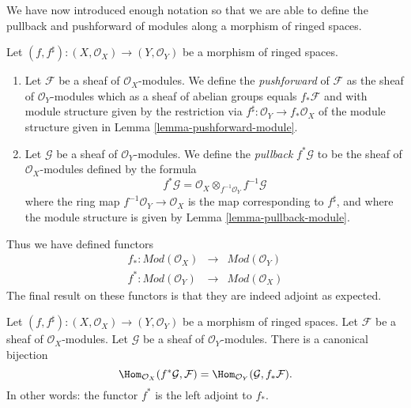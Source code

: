 \noindent
We have now introduced enough notation so that we are able to
define the pullback and pushforward of modules along a morphism
of ringed spaces.

\begin{definition}
\label{definition-pushforward}
Let $(f, f^\sharp) : (X, \mathcal{O}_X) \to (Y, \mathcal{O}_Y)$
be a morphism of ringed spaces.
\begin{enumerate}
\item Let $\mathcal{F}$ be a sheaf of $\mathcal{O}_X$-modules.
We define the {\it pushforward} of $\mathcal{F}$ as the
sheaf of $\mathcal{O}_Y$-modules which as a sheaf
of abelian groups equals $f_*\mathcal{F}$ and with
module structure given by the restriction
via $f^\sharp : \mathcal{O}_Y \to f_*\mathcal{O}_X$
of the module structure given
in Lemma \ref{lemma-pushforward-module}.
\item Let $\mathcal{G}$ be a sheaf of $\mathcal{O}_Y$-modules.
We define the {\it pullback} $f^*\mathcal{G}$ to be the
sheaf of $\mathcal{O}_X$-modules defined by the formula
$$
f^*\mathcal{G}
=
\mathcal{O}_X \otimes_{f^{-1}\mathcal{O}_Y} f^{-1}\mathcal{G}
$$
where the ring map $f^{-1}\mathcal{O}_Y \to \mathcal{O}_X$
is the map corresponding to $f^\sharp$, and where the  module
structure is given by Lemma \ref{lemma-pullback-module}.
\end{enumerate}
\end{definition}

\noindent
Thus we have defined functors
\begin{eqnarray*}
f_* : \textit{Mod}(\mathcal{O}_X)
& \longrightarrow &
\textit{Mod}(\mathcal{O}_Y) \\
f^* : \textit{Mod}(\mathcal{O}_Y)
& \longrightarrow &
\textit{Mod}(\mathcal{O}_X)
\end{eqnarray*}
The final result on these functors is that they are indeed
adjoint as expected.

\begin{lemma}
\label{lemma-adjoint-pullback-pushforward-modules}
Let $(f, f^\sharp) : (X, \mathcal{O}_X) \to (Y, \mathcal{O}_Y)$
be a morphism of ringed spaces.
Let $\mathcal{F}$ be a sheaf of $\mathcal{O}_X$-modules.
Let $\mathcal{G}$ be a sheaf of $\mathcal{O}_Y$-modules.
There is a canonical bijection
$$
\Hom_{\mathcal{O}_X}(f^*\mathcal{G}, \mathcal{F})
=
\Hom_{\mathcal{O}_Y}(\mathcal{G}, f_*\mathcal{F}).
$$
In other words: the functor $f^*$ is the left adjoint to
$f_*$.
\end{lemma}

